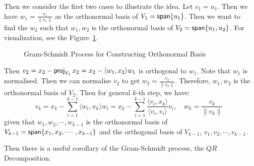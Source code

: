 Then we consider the first two cases to illustrate the idea. Let $v_1 = u_1$. Then we have $w_1 = \frac{v_1}{\| v_1 \|}$ as the orthonormal basis of $V_1 = \operatorname{\text{\normalfont\sffamily span}}\{u_1\}$. Then we want to find the $w_2$ such that $w_1, w_2$ is the orthonormal basis of $V_2 = \operatorname{\text{\normalfont\sffamily span}}\{u_1, u_2\}$. For visualization, see the Figure~\ref{fig:gram_schmidt_process}.

\begin{figure}[!ht]
	\caption{Gram-Schmidt Process for Constructing Orthonormal Basis}\label{fig:gram_schmidt_process}
\end{figure}

Then $v_2 = x_2 - \operatorname{\text{\normalfont\sffamily proj}}_{V_1} x_2 = x_2 - \langle w_1, x_2 \rangle w_1$ is orthogonal to $w_1$. Note that $w_1$ is normalised. Then we can normalise $v_2$ to get $w_2 = \frac{v_2}{\| v_2 \|}$. Therefore, $w_1, w_2$ is the orthonormal basis of $V_2$. Then for general $k$-th step, we have:
\[
	v_k = x_k - \sum_{i = 1}^{k - 1} \langle w_i, x_k \rangle w_i = x_k - \sum_{i = 1}^{k - 1} \frac{\langle v_i, x_k \rangle}{\langle v_i, v_i \rangle} v_i, \quad w_k = \frac{v_k}{\| v_k \|}
\]
given that $w_1, w_2, \cdots, w_{k - 1}$ is the orthonormal basis of $V_{k - 1} = \operatorname{\text{\normalfont\sffamily span}}\{x_1, x_2, \cdots, x_{k - 1}\}$ and the orthogonal basis of $V_{k - 1}$, $v_1, v_2, \cdots, v_{k - 1}$.

Then there is a useful corollary of the Gram-Schmidt process, the $QR$ Decomposition.


